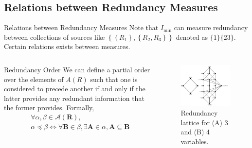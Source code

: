 \subsection{Relations between Redundancy Measures}
\begin{frame}{Relations between Redundancy Measures}
    Note that $I_{\min}$ can measure redundancy between collections of sources like $\left\{\left\{R_{1}\right\},\left\{R_{2}, R_{3}\right\}\right\}$ denoted as $\{1\}\{23\}$. Certain relations exists between measures.
    
    \begin{columns}
    \begin{column}{0.5\linewidth}
        \centering
        \begin{block}{Redundancy Order}
            We can define a partial order over the elements of $A(R)$ such that one is considered to precede another if and only if the latter provides any redundant information that the former provides. Formally,
            \begin{equation}\begin{aligned}&\forall \alpha, \beta \in \mathcal{A}(\mathbf{R}), \\
            &\alpha \preccurlyeq \beta \Leftrightarrow \forall \mathbf{B} \in \beta, \exists \mathbf{A} \in \alpha, \mathbf{A} \subseteq \mathbf{B}\end{aligned}\end{equation}
        \end{block}
    \end{column}
    \begin{column}{0.45\linewidth}
        \begin{figure}
            \centering
            \includegraphics[width=0.8\linewidth]{img/lattic.png}
            \caption{Redundancy lattice for (A) 3 and (B) 4 variables.}
            \label{fig:lattice}
        \end{figure}
    \end{column}
    \end{columns}
\end{frame}

